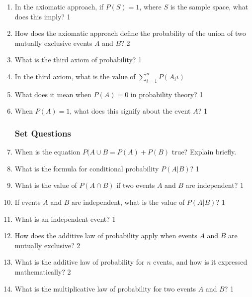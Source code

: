 \documentclass[a4paper,oneside]{book}
\begin{document}
\begin{enumerate}
\item In the axiomatic approach, if \( P(S) = 1 \), where \( S \) is the sample space, what does this imply? \hfill 1

\item How does the axiomatic approach define the probability of the union of two mutually exclusive events \( A \) and \( B \)? \hfill 2

\item What is the third axiom of probability? \hfill 1

\item In the third axiom, what is the value of $\displaystyle \sum_{i=1}^n P(A_ii)$

\item What does it mean when \( P(A) = 0 \) in probability theory? \hfill 1

\item When \( P(A) = 1 \), what does this signify about the event \( A \)? \hfill 1

\subsubsection{Set Questions}

\item When is the equation $P(A \cup B = P(A) + P(B)$ true? Explain briefly.

\item What is the formula for conditional probability \( P(A|B) \)? \hfill 1

\item What is the value of $P(A \cap B)$ if two events \( A \) and \( B \) are independent? \hfill 1

\item If events \( A \) and \( B \) are independent, what is the value of \( P(A|B) \)? \hfill 1

\item What is an independent event? \hfill 1

\item How does the additive law of probability apply when events \( A \) and \( B \) are mutually exclusive? \hfill 2

\item What is the additive law of probability for \( n \) events, and how is it expressed mathematically? \hfill 2

\item What is the multiplicative law of probability for two events \( A \) and \( B \)? \hfill 1


\end{enumerate}
\end{document}

